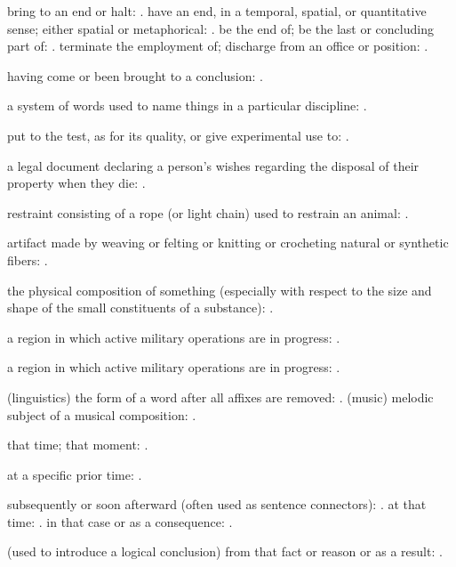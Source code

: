   bring to an end or halt: . have an end, in a temporal, spatial, or quantitative sense; either spatial or metaphorical: . be the end of; be the last or concluding part of: . terminate the employment of; discharge from an office or position: .

  having come or been brought to a conclusion: .

  a system of words used to name things in a particular discipline: .

  put to the test, as for its quality, or give experimental use to: .

  a legal document declaring a person's wishes regarding the disposal of their property when they die: .

  restraint consisting of a rope (or light chain) used to restrain an animal: .

  artifact made by weaving or felting or knitting or crocheting natural or synthetic fibers: .

  the physical composition of something (especially with respect to the size and shape of the small constituents of a substance): .

  a region in which active military operations are in progress: .

  a region in which active military operations are in progress: .

  (linguistics) the form of a word after all affixes are removed: . (music) melodic subject of a musical composition: .

  that time; that moment: .

  at a specific prior time: .

  subsequently or soon afterward (often used as sentence connectors): . at that time: . in that case or as a consequence: .

  (used to introduce a logical conclusion) from that fact or reason or as a result: .

